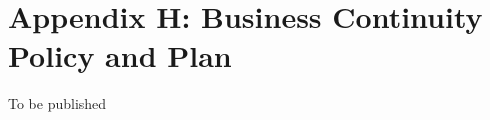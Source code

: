 \documentclass[../main.tex]{subfiles}
\begin{document}
\section{Appendix H: Business Continuity Policy and Plan}
To be published
\end{document}
